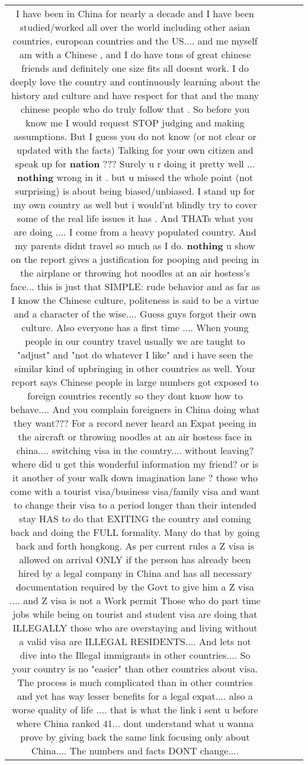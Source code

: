 \documentclass[11pt]{article}
\newlength\mylength
\begin{document}
\begin{center}
\begin{longtable}{|C{.65\mylength}|C{.30\mylength}|C{.12\mylength}|C{.12\mylength}|C{.12\mylength}|}
  \small I have been in China for nearly a decade and I have been studied/worked all over the world including other asian countries, european countries and the US.... and me myself am with a Chinese , and I do have tons of great chinese friends and definitely one size fits all doesnt work. I do deeply love the country and continuously learning about the history and culture and have respect for that and the many chinese people who do truly follow that . So before you know me I would request STOP judging and making assumptions. But I guess you do not know (or not clear or updated with the facts) Talking for your own citizen and speak up for \textbf{nation} ??? Surely u r doing it pretty well ... \textbf{nothing} wrong in it . but u missed the whole point (not surprising) is about being biased/unbiased. I stand up for my own country as well but i would'nt blindly try to cover some of the real life issues it has . And THATs what you are doing .... I come from a heavy populated country. And my parents didnt travel so much as I do. \textbf{nothing} u show on the report gives a justification for pooping and peeing in the airplane or throwing hot noodles at an air hostess's face... this is just that SIMPLE: rude behavior and as far as I know the Chinese culture, politeness is said to be a virtue and a character of the wise.... Guess guys forgot their own culture. Also everyone has a first time .... When young people in our country travel usually we are taught to "adjust" and "not do whatever I like" and i have seen the similar kind of upbringing in other countries as well. Your report says Chinese people in large numbers got exposed to foreign countries recently so they dont know how to behave.... And you complain foreigners in China doing what they want??? For a record never heard an Expat peeing in the aircraft or throwing noodles at an air hostess face in china.... switching visa in the country.... without leaving? where did u get this wonderful information my friend? or is it another of your walk down imagination lane ? those who come with a tourist visa/business visa/family visa and want to change their visa to a period longer than their intended stay HAS to do that EXITING the country and coming back and doing the FULL formality. Many do that by going back and forth hongkong. As per current rules a Z visa is allowed on arrival ONLY if the person has already been hired by a legal company in China and has all necessary documentation required by the Govt to give him a Z visa .... and Z visa is not a Work permit Those who do part time jobs while being on tourist and student visa are doing that ILLEGALLY those who are overstaying and living without a valid visa are ILLEGAL RESIDENTS.... And lets not dive into the Illegal immigrants in other countries.... So your country is no "easier" than other countries about visa. The process is much complicated than in other countries and yet has way lesser benefits for a legal expat.... also a worse quality of life .... that is what the link i sent u before where China ranked 41... dont understand what u wanna prove by giving back the same link focusing only about China.... The numbers and facts DONT change.... 
\end{longtable}
\end{center}
\end{document}
